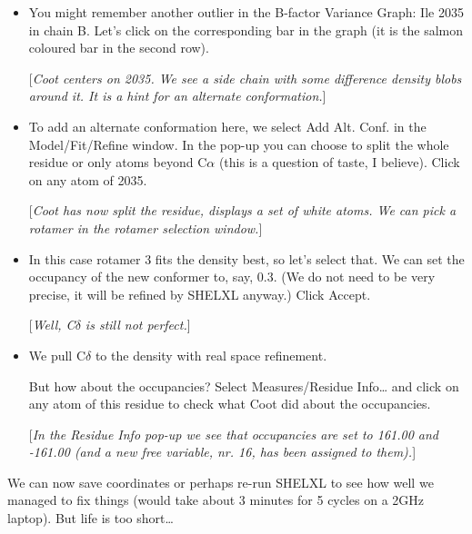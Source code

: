 \documentclass{article}
\begin{document}
\begin{itemize}
\item You might remember another outlier in the B-factor Variance
  Graph: Ile 2035 in chain B. Let's click on the corresponding bar in
  the graph (it is the salmon coloured bar in the second row).

  [\textsl{Coot centers on 2035. We see a side chain with some
    difference density blobs around it. It is a hint for an alternate
    conformation.}]

\item To add an alternate conformation here, we select \textsf{Add
    Alt. Conf.} in the \textsf{Model/Fit/Refine} window. In the pop-up
  you can choose to split the whole residue or only atoms beyond
  C$\alpha$ (this is a question of taste, I believe). Click on any
  atom of 2035.

  [\textsl{Coot has now split the residue, displays a set of white
    atoms. We can pick a rotamer in the rotamer selection window.}]

\item In this case rotamer 3 fits the density best, so let's select
  that. We can set the occupancy of the new conformer to, say, 0.3.
  (We do not need to be very precise, it will be refined by SHELXL
  anyway.) Click \textsf{Accept}.

  [\textsl{Well, C$\delta$ is still not perfect.}]

\item We pull C$\delta$ to the density with real space refinement.

  But how about the occupancies? Select \textsf{Measures/Residue
    Info\ldots} and click on any atom of this residue to check what
  Coot did about the occupancies.

  [\textsl{In the \textsf{Residue Info} pop-up we see that occupancies
    are set to 161.00 and -161.00 (and a new free variable, nr. 16,
    has been assigned to them).}]

\end{itemize}

We can now save coordinates or perhaps re-run SHELXL to see how well
we managed to fix things (would take about 3 minutes for 5 cycles on a
2GHz laptop). But life is too short\ldots
\end{document}
